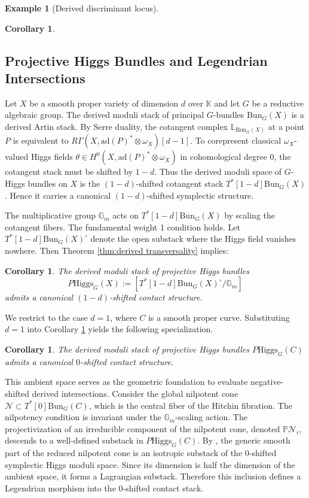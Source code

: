 \documentclass[reqno]{amsart}
\newtheorem{corollary}[theorem]{Corollary}
\theoremstyle{definition}
\newtheorem{example}[theorem]{Example}
\theoremstyle{remark}
\newcommand{\LL}{\mathbb{L}}
\newcommand{\Gm}{\mathbb{G}_m}
\newcommand{\K}{\mathbb{K}}
\begin{document}
{\begin{example}[Derived discriminant locus]
\begin{corollary}
\end{corollary}
 \end{example}   
 
\subsection{Projective Higgs Bundles and Legendrian Intersections}
Let $X$ be a smooth proper variety of dimension $d$ over $\K$ and let $G$ be a reductive algebraic group. The derived moduli stack of principal $G$-bundles $\mathrm{Bun}_G(X)$ is a derived Artin stack. 
By Serre duality, the cotangent complex $\LL_{\mathrm{Bun}_G(X)}$ at a point $P$ is equivalent to $R\Gamma(X, \mathrm{ad}(P)^* \otimes \omega_X)[d-1]$. To corepresent classical $\omega_X$-valued Higgs fields $\theta \in H^0(X, \mathrm{ad}(P)^* \otimes \omega_X)$ in cohomological degree 0, the cotangent stack must be shifted by $1-d$. Thus the derived moduli space of $G$-Higgs bundles on $X$ is the $(1-d)$-shifted cotangent stack $T^*[1-d]\mathrm{Bun}_G(X)$. Hence it carries a canonical $(1-d)$-shifted symplectic structure.

The multiplicative group $\Gm$ acts on $T^*[1-d]\mathrm{Bun}_G(X)$ by scaling the cotangent fibers. The fundamental weight 1 condition holds. Let $T^*[1-d]\mathrm{Bun}_G(X)^\circ$ denote the open substack where the Higgs field vanishes nowhere. Then Theorem \ref{thm:derived transversality} implies:

\begin{corollary} \label{cor:projective_higgs}
  The derived moduli stack of projective Higgs bundles
  \[
    P\mathrm{Higgs}_G(X) := [T^*[1-d]\mathrm{Bun}_G(X)^\circ / \Gm]
  \]
  admits a canonical $(1-d)$-shifted contact structure.
\end{corollary}

We restrict to the case $d=1$, where $C$ is a smooth proper curve. Substituting $d=1$ into Corollary \ref{cor:projective_higgs} yields the following specialization.

\begin{corollary} \label{cor:curve_higgs}
  The derived moduli stack of projective Higgs bundles $P\mathrm{Higgs}_G(C)$ admits a canonical $0$-shifted contact structure.
\end{corollary}

This ambient space serves as the geometric foundation to evaluate negative-shifted derived intersections.
Consider the global nilpotent cone $\mathcal{N} \subset T^*[0]\mathrm{Bun}_G(C)$, which is the central fiber of the Hitchin fibration. The nilpotency condition is invariant under the $\Gm$-scaling action. The projectivization of an irreducible component of the nilpotent cone, denoted $\mathbb{P}\mathcal{N}_i$, descends to a well-defined substack in $P\mathrm{Higgs}_G(C)$. By \cite[Theorem 6.9]{BenBassat}, the generic smooth part of the reduced nilpotent cone is an isotropic substack of the $0$-shifted symplectic Higgs moduli space. Since its dimension is half the dimension of the ambient space, it forms a Lagrangian substack. Therefore this inclusion defines a Legendrian morphism into the $0$-shifted contact stack.

}
\end{document}
